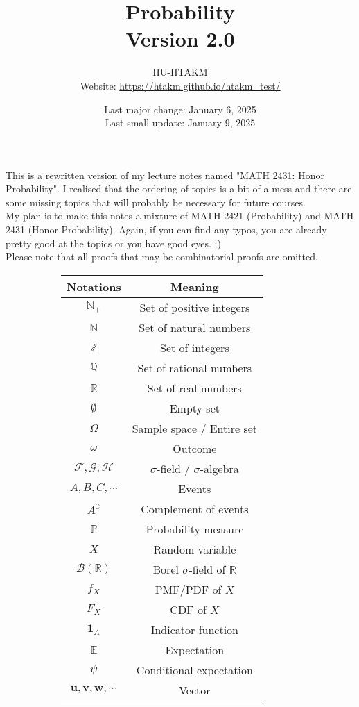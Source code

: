 \documentclass{huhtakm-template-book}
\title{
	\Huge Probability\\
	\small Version 2.0
}
\author{
	HU-HTAKM\\
	\small Website: \url{https://htakm.github.io/htakm_test/}
}
\date{
	Last major change: January 6, 2025\\
	Last small update: January 9, 2025
}
\newcommand{\prob}{\mathbb{P}}
\begin{document}
\maketitle
This is a rewritten version of my lecture notes named "MATH 2431: Honor Probability". I realised that the ordering of topics is a bit of a mess and there are some missing topics that will probably be necessary for future courses.\\
My plan is to make this notes a mixture of MATH 2421 (Probability) and MATH 2431 (Honor Probability). Again, if you can find any typos, you are already pretty good at the topics or you have good eyes. ;)\\
Please note that all proofs that may be combinatorial proofs are omitted.
\begin{figure}[h]
	\begin{subfigure}{0.45\textwidth}
		\centering
		\begin{tabular}{cc}
			Notations & Meaning\\
			\hline
			$\mathbb{N}_{+}$ & Set of positive integers\\
			$\mathbb{N}$ & Set of natural numbers\\
			$\mathbb{Z}$ & Set of integers\\
			$\mathbb{Q}$ & Set of rational numbers\\
			$\mathbb{R}$ & Set of real numbers\\
			$\emptyset$ & Empty set\\
			$\Omega$ & Sample space / Entire set\\
			$\omega$ & Outcome\\
			$\mathcal{F},\mathcal{G},\mathcal{H}$ & $\sigma$-field / $\sigma$-algebra\\
			$A,B,C,\cdots$ & Events\\
			$A^{\complement}$ & Complement of events\\
			$\prob$ & Probability measure\\
			$X$ & Random variable\\
			$\mathcal{B}(\mathbb{R})$ & Borel $\sigma$-field of $\mathbb{R}$ \\
			$f_{X}$ & PMF/PDF of $X$\\
			$F_{X}$ & CDF of $X$\\
			$\mathbf{1}_{A}$ & Indicator function\\
			$\mathbb{E}$ & Expectation\\
			$\psi$ & Conditional expectation\\
			$\mathbf{u},\mathbf{v},\mathbf{w},\cdots$ & Vector\\

\end{tabular}
\end{subfigure}
\end{figure}
\end{document}
